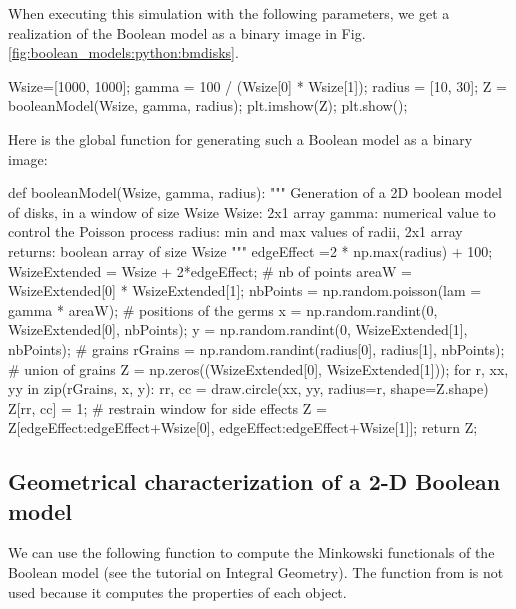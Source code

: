 When executing this simulation with the following parameters, we get a realization of the Boolean model as a binary image in Fig.\ref{fig:boolean_models:python:bmdisks}.

\begin{python}
Wsize=[1000, 1000]; 
gamma = 100 / (Wsize[0] * Wsize[1]);
radius = [10, 30];
Z = booleanModel(Wsize, gamma, radius);
plt.imshow(Z);
plt.show();
\end{python}


Here is the global function for generating such a Boolean model as a binary image:
\begin{python}
def booleanModel(Wsize, gamma, radius):
    """
    Generation of a 2D boolean model of disks, in a window of size Wsize
    Wsize: 2x1 array
    gamma: numerical value to control the Poisson process
    radius: min and max values of radii, 2x1 array
    returns: boolean array of size Wsize
    """
    edgeEffect =2 * np.max(radius) + 100;
    WsizeExtended = Wsize + 2*edgeEffect;
    # nb of points
    areaW = WsizeExtended[0] * WsizeExtended[1];
    nbPoints = np.random.poisson(lam = gamma * areaW);
    # positions of the germs
    x = np.random.randint(0, WsizeExtended[0], nbPoints);
    y = np.random.randint(0, WsizeExtended[1], nbPoints);
    # grains
    rGrains = np.random.randint(radius[0], radius[1], nbPoints);
    # union of grains
    Z = np.zeros((WsizeExtended[0], WsizeExtended[1]));
    for r, xx, yy in zip(rGrains, x, y):
        rr, cc = draw.circle(xx, yy, radius=r, shape=Z.shape)
        Z[rr, cc] = 1;
    # restrain window for side effects
    Z = Z[edgeEffect:edgeEffect+Wsize[0], edgeEffect:edgeEffect+Wsize[1]];
    return Z;
\end{python}



\subsection{Geometrical characterization of a 2-D Boolean model}
We can use the following function to compute the Minkowski functionals of the Boolean model (see the tutorial on Integral Geometry). The  function from  is not used because it computes the properties of each object.

